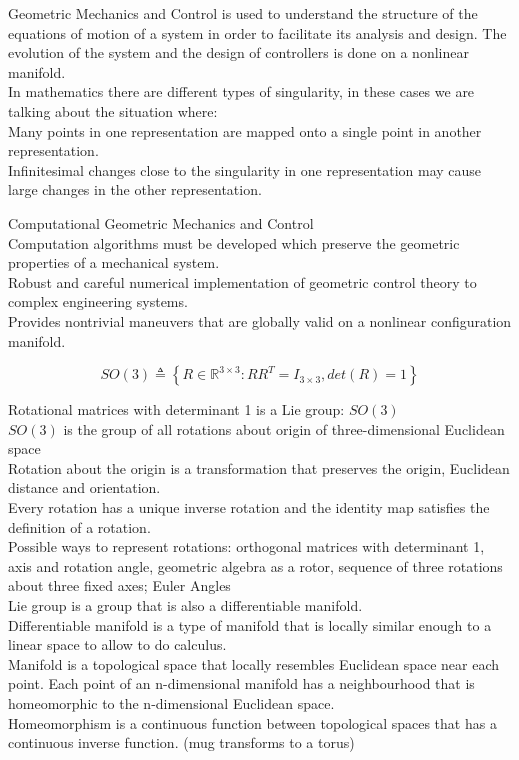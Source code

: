 Geometric Mechanics and Control is used to understand the structure of the equations of motion of a system in order to facilitate its analysis and design. The evolution of the system and the design of controllers is done on a nonlinear manifold.\\

In mathematics there are different types of singularity, in these cases we are talking about the situation where:\\
Many points in one representation are mapped onto a single point in another representation.\\
Infinitesimal changes close to the singularity in one representation may cause large changes in the other representation.

Computational Geometric Mechanics and Control\\
Computation algorithms must be developed which preserve the geometric properties of a mechanical system.\\
Robust and careful numerical implementation of geometric control theory to complex engineering systems.\\
Provides nontrivial maneuvers that are globally valid on a nonlinear configuration manifold.



\begin{equation}\label{key}
SO(3) \triangleq \left\lbrace R\in\mathbb{R}^{3\times3}:RR^T=I_{3\times3},det(R)=1\right\rbrace 
\end{equation}

Rotational matrices with determinant 1 is a Lie group: $ SO(3) $\\
$ SO(3) $ is the group of all rotations about origin of three-dimensional Euclidean space\\
Rotation about the origin is a transformation that preserves the origin, Euclidean distance and orientation.\\
Every rotation has a unique inverse rotation and the identity map satisfies the definition of a rotation.\\
Possible ways to represent rotations: orthogonal matrices with determinant 1, axis and rotation angle, geometric algebra as a rotor, sequence of three rotations about three fixed axes; Euler Angles\\
Lie group is a group that is also a differentiable manifold.\\
Differentiable manifold is a type of manifold that is locally similar enough to a linear space to allow to do calculus.\\
Manifold is a topological space that locally resembles Euclidean space near each point. Each point of an n-dimensional manifold has a neighbourhood that is homeomorphic to the n-dimensional Euclidean space.\\
Homeomorphism is a continuous function between topological spaces that has a continuous inverse function. (mug transforms to a torus)\\



